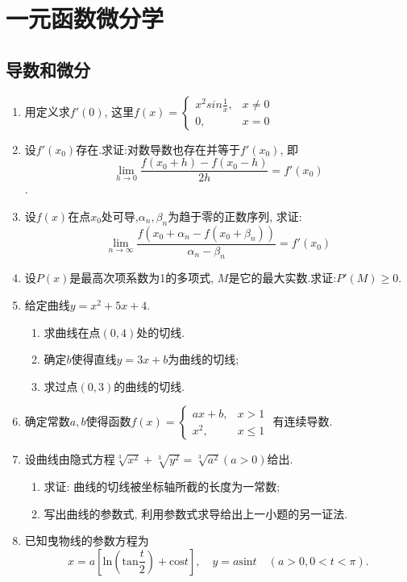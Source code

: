 \chapter{一元函数微分学}
\section{导数和微分}
\begin{enumerate}
    \item 用定义求$f'(0)$, 这里$f(x)=\begin{cases}
    x^2sin\frac{1}{x},&x\ne 0\\
    0,&x=0
    \end{cases}$
    \item 设$f'(x_0)$存在.求证:对数导数也存在并等于$f'(x_0)$, 即\\
    $$\lim\limits_{h\rightarrow 0}\frac{f(x_0+h)-f(x_0-h)}{2h}=f'(x_0)$$.
    \item 设$f(x)$在点$x_0$处可导,$\alpha_n,\beta_n$为趋于零的正数序列, 求证: 
    $$\lim\limits_{n\rightarrow \infty}\frac{f(x_0+\alpha_n-f(x_0+\beta_n))}{\alpha_n-\beta_n}
    = f'(x_0)$$
    \item 设$P(x)$是最高次项系数为1的多项式, $M$是它的最大实数.求证:$P'(M)\ge 0$.
    \item 给定曲线$y=x^2+5x+4$.
    \begin{enumerate}
    	\item 求曲线在点$(0,4)$处的切线.
    	\item 确定$b$使得直线$y=3x+b$为曲线的切线;
    	\item 求过点$(0,3)$的曲线的切线.
    \end{enumerate}
	\item 确定常数$a,b$使得函数$f(x)=\begin{cases}
	ax+b,&x>1\\
	x^2,&x\le 1
	\end{cases}$
	有连续导数.
	\item 设曲线由隐式方程$\sqrt[3]{x^2}+\sqrt[3]{y^2}=\sqrt[3]{a^2}(a>0)$给出.
	\begin{enumerate}
		\item 求证: 曲线的切线被坐标轴所截的长度为一常数;
		\item 写出曲线的参数式, 利用参数式求导给出上一小题的另一证法.
	\end{enumerate}
		\item 已知曳物线的参数方程为$$
		x=a[\mathrm{ln}(\mathrm{tan}\frac{t}{2})+\mathrm{cos}t],\quad y=a\mathrm{sin}t\quad
		(a>0,0<t<\pi).$$

\end{enumerate}
